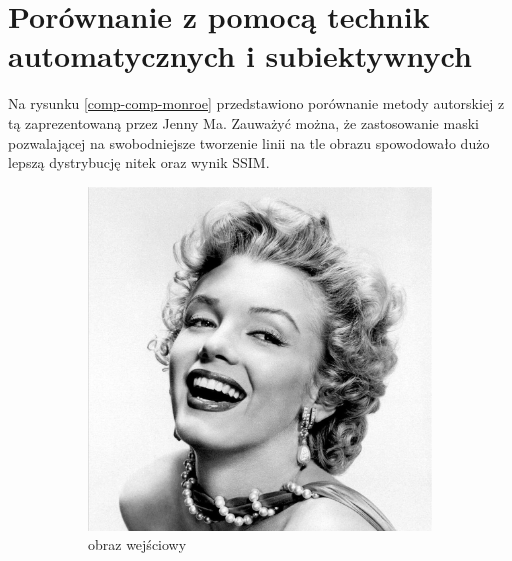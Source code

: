\section{Porównanie z pomocą technik automatycznych i subiektywnych} \label{comp-comp}
	Na rysunku \ref{comp-comp-monroe} przedstawiono porównanie metody autorskiej z tą zaprezentowaną przez Jenny Ma. Zauważyć można, że zastosowanie maski pozwalającej na swobodniejsze tworzenie linii na tle obrazu spowodowało dużo lepszą dystrybucję nitek oraz wynik SSIM.
	\begin{figure}[H] 
    \centering
    \begin{subfigure}{0.40\textwidth}
        \centering
        \includegraphics[width = \textwidth]{img/6-comp/monroe-portrait_original_c10_inv0.png}
        \caption{obraz wejściowy}
        \label{comp-comp-monroe-a}
    \end{subfigure}
    \begin{subfigure}{0.40\textwidth}
        \centering

\end{subfigure}
\end{figure}
